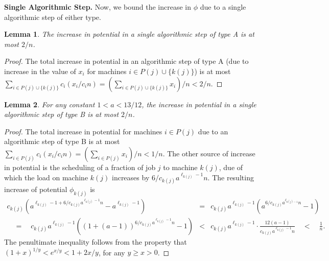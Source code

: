 \documentclass[11pt]{article}
\newtheorem{lemma}{Lemma}
\begin{document}
\noindent
{\bf Single Algorithmic Step.}
Now, we bound the increase in $\phi$ due to a single algorithmic step of either type.
\begin{lemma}
\label{lma:singleA}
The increase in potential in a single algorithmic step of type A 
is at most $2/n$.
\end{lemma}
\begin{proof}
The total increase in potential in an algorithmic step of type A (due to increase
in the value of $x_i$ for machines $i\in P(j)\cup \{k(j)\}$) is 
at most 
$\sum_{i\in P(j)\cup \{k(j)\}} c_i (x_i/c_i n) = (\sum_{i\in P(j)\cup \{k(j)\}} x_i)/n < 2/n$.
\end{proof}
\noindent
\begin{lemma}
\label{lma:singleB}
For any constant $1 < a < 13/12$, the increase in potential in a single algorithmic 
step of type B is at most $2/n$.
\end{lemma}
\begin{proof}
The total increase in potential for machines $i\in P(j)$ due to an 
algorithmic step of type B is at most
$\sum_{i\in P(j)} c_i (x_i/c_i n) = (\sum_{i\in P(j)} x_i)/n < 1/n$.
The other source of increase in potential is the scheduling of 
a fraction of job $j$ to machine $k(j)$, due of which
the load on machine 
$k(j)$ increases by $6/c_{k(j)}a^{\ell_{k(j)}-1} n$. The resulting
increase of potential $\phi_{k(j)}$ is 
\begin{eqnarray*}
c_{k(j)} (a^{\ell_{k(j)} - 1 + 6/c_{k(j)}a^{\ell_{k(j)} - 1} n} - a^{\ell_{k(j)} - 1}) 
& = & c_{k(j)} a^{\ell_{k(j)} - 1} (a^{6/c_{k(j)}a^{\ell_{k(j) - 1}} n} - 1) \\
\quad = \quad c_{k(j)} a^{\ell_{k(j)} - 1} \left(\left(1 + (a-1)\right)^{6/c_{k(j)} a^{\ell_{k(j)} - 1} n} -  1 \right)
& < & c_{k(j)} a^{\ell_{k(j)} - 1} \cdot \frac{12(a-1)}{c_{k(j)} a^{\ell_{k(j)} - 1} n} 
\quad < \quad \frac{1}{n}.
\end{eqnarray*}
The penultimate inequality follows from the property that
$(1 + x)^{1/y} < e^{x/y} < 1 + 2x/y$, 
for any $y \geq x > 0$.
\end{proof}
\end{document}
